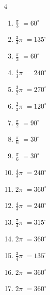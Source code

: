 \begin{multicols}{4}
\begin{enumerate}
  \item $\displaystyle \frac{\pi}{3}$
        $\displaystyle =60^{\circ}$

  \item $\displaystyle \frac{3}{4}\pi$
        $\displaystyle =135^{\circ}$

  \item $\displaystyle \frac{\pi}{3}$
        $\displaystyle =60^{\circ}$

  \item $\displaystyle \frac{4}{3}\pi$
        $\displaystyle =240^{\circ}$

  \item $\displaystyle \frac{3}{2}\pi$
        $\displaystyle =270^{\circ}$

  \item $\displaystyle \frac{2}{3}\pi$
        $\displaystyle =120^{\circ}$

  \item $\displaystyle \frac{\pi}{2}$
        $\displaystyle =90^{\circ}$

\columnbreak %

  \item $\displaystyle \frac{\pi}{6}$
        $\displaystyle =30^{\circ}$

  \item $\displaystyle \frac{\pi}{6}$
        $\displaystyle =30^{\circ}$

  \item $\displaystyle \frac{4}{3}\pi$
        $\displaystyle =240^{\circ}$

  \item $\displaystyle 2\pi$
        $\displaystyle =360^{\circ}$

  \item $\displaystyle \frac{4}{3}\pi$
        $\displaystyle =240^{\circ}$

  \item $\displaystyle \frac{7}{4}\pi$
        $\displaystyle =315^{\circ}$

  \item $\displaystyle 2\pi$
        $\displaystyle =360^{\circ}$

  \item $\displaystyle \frac{3}{4}\pi$
        $\displaystyle =135^{\circ}$

  \item $\displaystyle 2\pi$
        $\displaystyle =360^{\circ}$

  \item $\displaystyle 2\pi$
        $\displaystyle =360^{\circ}$


\end{enumerate}
\end{multicols}
